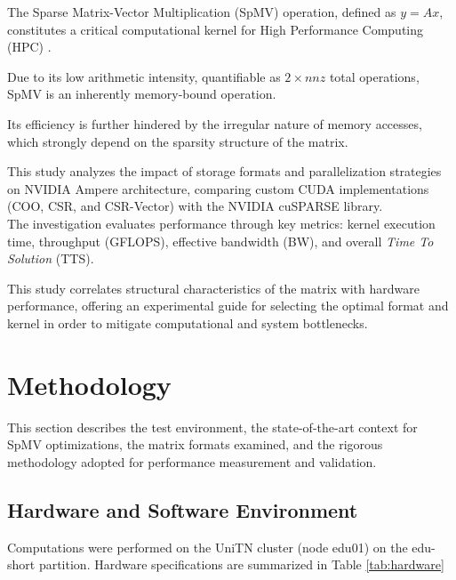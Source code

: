 \documentclass[conference]{IEEEtran}
\begin{document}
The Sparse Matrix-Vector Multiplication (SpMV) operation, defined as $y = Ax$, constitutes a critical computational kernel for High Performance Computing (HPC) \cite{bGao2024}.

Due to its low arithmetic intensity, quantifiable as $2 \times nnz$ total operations, SpMV is an inherently memory-bound operation.

Its efficiency is further hindered by the irregular nature of memory accesses, which strongly depend on the sparsity structure of the matrix.

This study analyzes the impact of storage formats and parallelization strategies on NVIDIA Ampere architecture, comparing custom CUDA implementations (COO, CSR, and CSR-Vector) with the NVIDIA cuSPARSE library.\\

The investigation evaluates performance through key metrics: kernel execution time, throughput (GFLOPS), effective bandwidth (BW), and overall \textit{Time To Solution} (TTS).

This study correlates structural characteristics of the matrix with hardware performance, offering an experimental guide for selecting the optimal format and kernel in order to mitigate computational and system bottlenecks.


\section{Methodology}

This section describes the test environment, the state-of-the-art context for SpMV optimizations, the matrix formats examined, and the rigorous methodology adopted for performance measurement and validation.


\subsection{Hardware and Software Environment}

Computations were performed on the UniTN cluster (node edu01) on the edu-short partition. Hardware specifications are summarized in Table \ref{tab:hardware}
\end{document}
